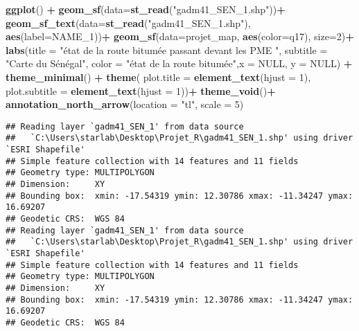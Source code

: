 \documentclass[
]{article}
\newenvironment{Shaded}{\begin{snugshade}}{\end{snugshade}}
\newcommand{\AttributeTok}[1]{\textcolor[rgb]{0.13,0.29,0.53}{#1}}
\newcommand{\ConstantTok}[1]{\textcolor[rgb]{0.56,0.35,0.01}{#1}}
\newcommand{\DecValTok}[1]{\textcolor[rgb]{0.00,0.00,0.81}{#1}}
\newcommand{\FunctionTok}[1]{\textcolor[rgb]{0.13,0.29,0.53}{\textbf{#1}}}
\newcommand{\NormalTok}[1]{#1}
\newcommand{\SpecialCharTok}[1]{\textcolor[rgb]{0.81,0.36,0.00}{\textbf{#1}}}
\newcommand{\StringTok}[1]{\textcolor[rgb]{0.31,0.60,0.02}{#1}}
\begin{document}
\begin{Shaded}
\begin{Highlighting}[]
\FunctionTok{ggplot}\NormalTok{() }\SpecialCharTok{+}
  \FunctionTok{geom\_sf}\NormalTok{(}\AttributeTok{data=}\FunctionTok{st\_read}\NormalTok{(}\StringTok{"gadm41\_SEN\_1.shp"}\NormalTok{))}\SpecialCharTok{+}
  \FunctionTok{geom\_sf\_text}\NormalTok{(}\AttributeTok{data=}\FunctionTok{st\_read}\NormalTok{(}\StringTok{"gadm41\_SEN\_1.shp"}\NormalTok{), }\FunctionTok{aes}\NormalTok{(}\AttributeTok{label=}\NormalTok{NAME\_1))}\SpecialCharTok{+}
  \FunctionTok{geom\_sf}\NormalTok{(}\AttributeTok{data=}\NormalTok{projet\_map, }\FunctionTok{aes}\NormalTok{(}\AttributeTok{color=}\NormalTok{q17), }\AttributeTok{size=}\DecValTok{2}\NormalTok{)}\SpecialCharTok{+}
  \FunctionTok{labs}\NormalTok{(}\AttributeTok{title =} \StringTok{"état de la route bitumée passant devant les PME "}\NormalTok{,}
       \AttributeTok{subtitle =} \StringTok{"Carte du Sénégal"}\NormalTok{,}
       \AttributeTok{color =} \StringTok{"état de la route bitumée"}\NormalTok{,}\AttributeTok{x =} \ConstantTok{NULL}\NormalTok{, }\AttributeTok{y =} \ConstantTok{NULL}\NormalTok{) }\SpecialCharTok{+}
  \FunctionTok{theme\_minimal}\NormalTok{() }\SpecialCharTok{+}
  \FunctionTok{theme}\NormalTok{(}
    \AttributeTok{plot.title =} \FunctionTok{element\_text}\NormalTok{(}\AttributeTok{hjust =} \DecValTok{1}\NormalTok{),}
    \AttributeTok{plot.subtitle =} \FunctionTok{element\_text}\NormalTok{(}\AttributeTok{hjust =} \DecValTok{1}\NormalTok{))}\SpecialCharTok{+}
  \FunctionTok{theme\_void}\NormalTok{()}\SpecialCharTok{+}
  \FunctionTok{annotation\_north\_arrow}\NormalTok{(}\AttributeTok{location =} \StringTok{"tl"}\NormalTok{, }\AttributeTok{scale =} \DecValTok{5}\NormalTok{)}
\end{Highlighting}
\end{Shaded}

\begin{verbatim}
## Reading layer `gadm41_SEN_1' from data source 
##   `C:\Users\starlab\Desktop\Projet_R\gadm41_SEN_1.shp' using driver `ESRI Shapefile'
## Simple feature collection with 14 features and 11 fields
## Geometry type: MULTIPOLYGON
## Dimension:     XY
## Bounding box:  xmin: -17.54319 ymin: 12.30786 xmax: -11.34247 ymax: 16.69207
## Geodetic CRS:  WGS 84
## Reading layer `gadm41_SEN_1' from data source 
##   `C:\Users\starlab\Desktop\Projet_R\gadm41_SEN_1.shp' using driver `ESRI Shapefile'
## Simple feature collection with 14 features and 11 fields
## Geometry type: MULTIPOLYGON
## Dimension:     XY
## Bounding box:  xmin: -17.54319 ymin: 12.30786 xmax: -11.34247 ymax: 16.69207
## Geodetic CRS:  WGS 84
\end{verbatim}
\end{document}
